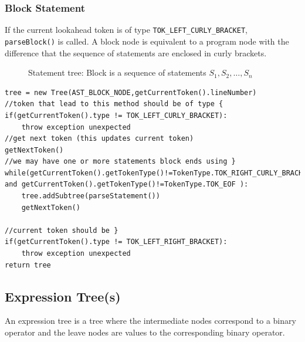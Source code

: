 \subsubsection{Block Statement}
\label{sec:block statement tree}
If the current lookahead token is of type \verb!TOK_LEFT_CURLY_BRACKET!, \verb!parseBlock()! is called. 
A block node is equivalent to a program node with the difference that the sequence of statements are enclosed in curly brackets.
\begin{figure}[H]
	\centering
	\caption{Statement tree: Block is a sequence of statements $S_1,S_2,\ldots,S_n$}
	\label{fig:tinylang block tree}
\end{figure}
\begin{lstlisting}[caption=PSEUDOCODE for building a block tree (\emph{parseBlock()}),label=listing:block statement tree]
tree = new Tree(AST_BLOCK_NODE,getCurrentToken().lineNumber)
//token that lead to this method should be of type {
if(getCurrentToken().type != TOK_LEFT_CURLY_BRACKET):
    throw exception unexpected 
//get next token (this updates current token)
getNextToken()    
//we may have one or more statements block ends using }
while(getCurrentToken().getTokenType()!=TokenType.TOK_RIGHT_CURLY_BRACKET and getCurrentToken().getTokenType()!=TokenType.TOK_EOF ):
    tree.addSubtree(parseStatement())
    getNextToken()

//current token should be }
if(getCurrentToken().type != TOK_LEFT_RIGHT_BRACKET):
    throw exception unexpected 
return tree
\end{lstlisting}



\subsection{Expression Tree(s)}
\label{sec:expression tree building }
An expression tree is a tree where the intermediate nodes correspond to a binary operator and the leave nodes are values to the corresponding binary operator.

